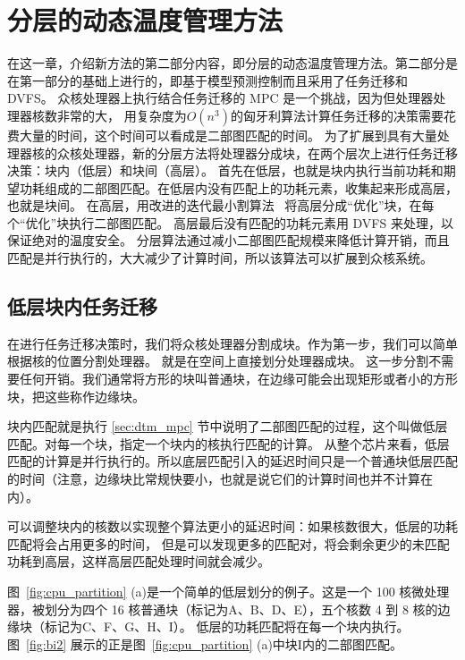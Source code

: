 
\chapter{分层的动态温度管理方法}\label{chpter:new_method}

在这一章，介绍新方法的第二部分内容，即分层的动态温度管理方法。第二部分是在第一部分的基础上进行的，即基于模型预测控制而且采用了任务迁移和 DVFS。
众核处理器上执行结合任务迁移的 MPC 是一个挑战，因为但处理器处理器核数非常的大，
用复杂度为$O(n^{3})$的匈牙利算法计算任务迁移的决策需要花费大量的时间，这个时间可以看成是二部图匹配的时间。
为了扩展到具有大量处理器核的众核处理器，新的分层方法将处理器分成块，在两个层次上进行任务迁移决策：块内（低层）和块间（高层）。
首先在低层，也就是块内执行当前功耗和期望功耗组成的二部图匹配。在低层内没有匹配上的功耗元素，收集起来形成高层，也就是块间。
在高层，用改进的迭代最小割算法~  将高层分成“优化”块，在每个“优化”块执行二部图匹配。
高层最后没有匹配的功耗元素用 DVFS 来处理，以保证绝对的温度安全。
分层算法通过减小二部图匹配规模来降低计算开销，而且匹配是并行执行的，大大减少了计算时间，所以该算法可以扩展到众核系统。

\section{低层块内任务迁移}\label{sec:parts}

在进行任务迁移决策时，我们将众核处理器分割成块。作为第一步，我们可以简单根据核的位置分割处理器。
就是在空间上直接划分处理器成块。
这一步分割不需要任何开销。我们通常将方形的块叫普通块，在边缘可能会出现矩形或者小的方形块，把这些称作边缘块。

块内匹配就是执行 \ref{sec:dtm_mpc} 节中说明了二部图匹配的过程，这个叫做低层匹配。对每一个块，指定一个块内的核执行匹配的计算。
从整个芯片来看，低层匹配的计算是并行执行的。所以底层匹配引入的延迟时间只是一个普通块低层匹配的时间（注意，边缘块比常规快要小，也就是说它们的计算时间也并不计算在内）。

可以调整块内的核数以实现整个算法更小的延迟时间：如果核数很大，低层的功耗匹配将会占用更多的时间，
但是可以发现更多的匹配对，将会剩余更少的未匹配功耗到高层，这样高层匹配处理时间就会减少。

图~\ref{fig:cpu_partition} (a)是一个简单的低层划分的例子。这是一个 100 核微处理器，被划分为四个 16 核普通块（标记为A、B、D、E），五个核数 4 到 8 核的边缘块（标记为C、F、G、H、I）。
低层的功耗匹配将在每一个块内执行。图~\ref{fig:bi2} 展示的正是图~\ref{fig:cpu_partition} (a)中块I内的二部图匹配。

